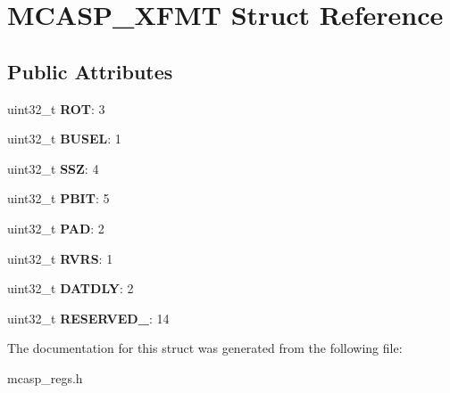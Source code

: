 \hypertarget{structMCASP__XFMT}{\section{M\-C\-A\-S\-P\-\_\-\-X\-F\-M\-T Struct Reference}
\label{structMCASP__XFMT}
}
\subsection*{Public Attributes}
\begin{DoxyCompactItemize}
\item 
\hypertarget{structMCASP__XFMT_a92fc5f568987a1bdac963d0e79e3dd3c}{uint32\-\_\-t {\bfseries R\-O\-T}\-: 3}\label{structMCASP__XFMT_a92fc5f568987a1bdac963d0e79e3dd3c}

\item 
\hypertarget{structMCASP__XFMT_a9dc423e16466d9e7b04c43616d775d7b}{uint32\-\_\-t {\bfseries B\-U\-S\-E\-L}\-: 1}\label{structMCASP__XFMT_a9dc423e16466d9e7b04c43616d775d7b}

\item 
\hypertarget{structMCASP__XFMT_a907f5d7703755427eb2338d8c181d300}{uint32\-\_\-t {\bfseries S\-S\-Z}\-: 4}\label{structMCASP__XFMT_a907f5d7703755427eb2338d8c181d300}

\item 
\hypertarget{structMCASP__XFMT_a534c010aff9469181ba28b1cd17dbe4d}{uint32\-\_\-t {\bfseries P\-B\-I\-T}\-: 5}\label{structMCASP__XFMT_a534c010aff9469181ba28b1cd17dbe4d}

\item 
\hypertarget{structMCASP__XFMT_ad7c5b6a6e352bcc8502e58bc1f4450ba}{uint32\-\_\-t {\bfseries P\-A\-D}\-: 2}\label{structMCASP__XFMT_ad7c5b6a6e352bcc8502e58bc1f4450ba}

\item 
\hypertarget{structMCASP__XFMT_acc2fea28fd11046cf4f7066ac7b1bcd4}{uint32\-\_\-t {\bfseries R\-V\-R\-S}\-: 1}\label{structMCASP__XFMT_acc2fea28fd11046cf4f7066ac7b1bcd4}

\item 
\hypertarget{structMCASP__XFMT_a937a95f831ed42b7a7b2f0df7bb198bd}{uint32\-\_\-t {\bfseries D\-A\-T\-D\-L\-Y}\-: 2}\label{structMCASP__XFMT_a937a95f831ed42b7a7b2f0df7bb198bd}

\item 
\hypertarget{structMCASP__XFMT_a67a975b17b7b348cb901ad25269d777a}{uint32\-\_\-t {\bfseries R\-E\-S\-E\-R\-V\-E\-D\-\_}\-: 14}\label{structMCASP__XFMT_a67a975b17b7b348cb901ad25269d777a}

\end{DoxyCompactItemize}


The documentation for this struct was generated from the following file\-:\begin{DoxyCompactItemize}
\item 
mcasp\-\_\-regs.\-h\end{DoxyCompactItemize}
